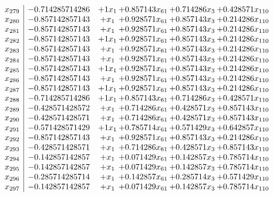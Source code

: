 \documentclass[11pt]{article}
\begin{document}
\[\begin{array}{c| c c@{\hskip 2pt} c@{\hskip 2pt} c@{\hskip 2pt} c@{\hskip 2pt} }
 x_{279}   &  -0.714285714286 & + 1 x_{1} & + 0.857143 x_{61} & + 0.714286 x_{3} & + 0.428571 x_{110}\\
 x_{280}   &  -0.857142857143 & +  x_{1} & + 0.928571 x_{61} & + 0.857143 x_{3} & + 0.214286 x_{110}\\
 x_{281}   &  -0.857142857143 & +  x_{1} & + 0.928571 x_{61} & + 0.857143 x_{3} & + 0.214286 x_{110}\\
 x_{282}   &  -0.857142857143 & + 1 x_{1} & + 0.928571 x_{61} & + 0.857143 x_{3} & + 0.214286 x_{110}\\
 x_{283}   &  -0.857142857143 & +  x_{1} & + 0.928571 x_{61} & + 0.857143 x_{3} & + 0.214286 x_{110}\\
 x_{284}   &  -0.857142857143 & +  x_{1} & + 0.928571 x_{61} & + 0.857143 x_{3} & + 0.214286 x_{110}\\
 x_{285}   &  -0.857142857143 & + 1 x_{1} & + 0.928571 x_{61} & + 0.857143 x_{3} & + 0.214286 x_{110}\\
 x_{286}   &  -0.857142857143 & +  x_{1} & + 0.928571 x_{61} & + 0.857143 x_{3} & + 0.214286 x_{110}\\
 x_{287}   &  -0.857142857143 & + 1 x_{1} & + 0.928571 x_{61} & + 0.857143 x_{3} & + 0.214286 x_{110}\\
 x_{288}   &  -0.714285714286 & + 1 x_{1} & + 0.857143 x_{61} & + 0.714286 x_{3} & + 0.428571 x_{110}\\
 x_{289}   &  -0.428571428572 & +  x_{1} & + 0.714286 x_{61} & + 0.428571 x_{3} & + 0.857143 x_{110}\\
 x_{290}   &  -0.428571428571 & +  x_{1} & + 0.714286 x_{61} & + 0.428571 x_{3} & + 0.857143 x_{110}\\
 x_{291}   &  -0.571428571429 & + 1 x_{1} & + 0.785714 x_{61} & + 0.571429 x_{3} & + 0.642857 x_{110}\\
 x_{292}   &  -0.857142857143 & +  x_{1} & + 0.928571 x_{61} & + 0.857143 x_{3} & + 0.214286 x_{110}\\
 x_{293}   &  -0.428571428571 & +  x_{1} & + 0.714286 x_{61} & + 0.428571 x_{3} & + 0.857143 x_{110}\\
 x_{294}   &  -0.142857142857 & +  x_{1} & + 0.071429 x_{61} & + 0.142857 x_{3} & + 0.785714 x_{110}\\
 x_{295}   &  -0.142857142857 & +  x_{1} & + 0.071429 x_{61} & + 0.142857 x_{3} & + 0.785714 x_{110}\\
 x_{296}   &  -0.285714285714 & +  x_{1} & + 0.142857 x_{61} & + 0.285714 x_{3} & + 0.571429 x_{110}\\
 x_{297}   &  -0.142857142857 & +  x_{1} & + 0.071429 x_{61} & + 0.142857 x_{3} & + 0.785714 x_{110}\\

\end{array}\]
\end{document}
